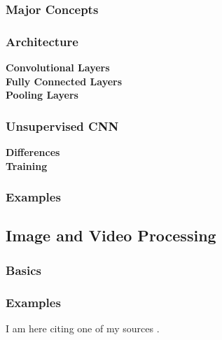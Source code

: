 \documentclass[../Main.tex]{subfiles}
\begin{document}
    \subsubsection{Major Concepts}
    \subsubsection{Architecture}
        \textbf{Convolutional Layers} \\
        \textbf{Fully Connected Layers} \\
        \textbf{Pooling Layers} \\
    \subsubsection{Unsupervised CNN}
        \textbf{Differences} \\
        \textbf{Training} \\
    \subsubsection{Examples}


\subsection{Image and Video Processing}
    \subsubsection{Basics}
    \subsubsection{
    }
    \subsubsection{Examples}


\lipsum[10] %

\lipsum[15] %


I am here citing one of my sources \citep{ISLR}.

\biblio %
\end{document}
